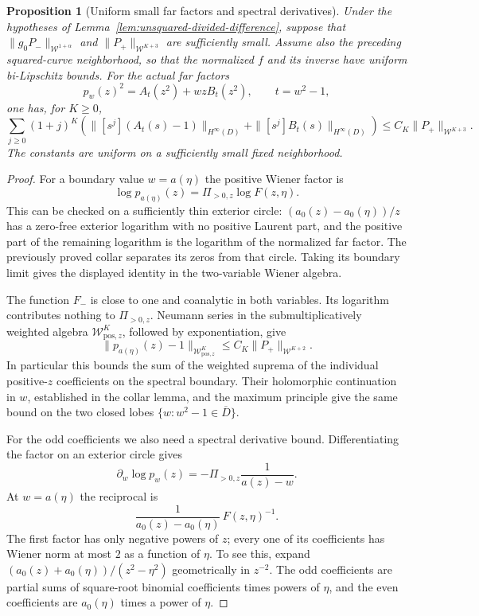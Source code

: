 \documentclass[11pt]{article}
\newtheorem{proposition}{Proposition}[section]
\begin{document}
\begin{proposition}[Uniform small far factors and spectral derivatives]
\label{prop:small-far-factors}
Under the hypotheses of Lemma~\ref{lem:unsquared-divided-difference}, suppose that
$\|g_0P_-\|_{\mathcal W^{1+\alpha}}$ and
$\|P_+\|_{\mathcal W^{K+3}}$ are sufficiently small.
Assume also the preceding squared-curve neighborhood, so that
the normalized $f$ and its inverse have uniform bi-Lipschitz bounds.
For the actual far factors
\[
 p_w(z)^2=A_t(z^2)+wzB_t(z^2),\qquad t=w^2-1,
\]
one has, for $K\ge0$,
\[
 \sum_{j\ge0}(1+j)^K\left(
  \|[s^j](A_t(s)-1)\|_{H^\infty(D)}
       +\|[s^j]B_t(s)\|_{H^\infty(D)}\right)
 \le C_K\|P_+\|_{\mathcal W^{K+3}}.
\]
The constants are uniform on a sufficiently small fixed neighborhood.
\end{proposition}
\begin{proof}
For a boundary value $w=a(\eta)$ the positive Wiener factor is
\[
 \log p_{a(\eta)}(z)=\Pi_{>0,z}\log F(z,\eta).
\]
This can be checked on a sufficiently thin exterior circle:
$(a_0(z)-a_0(\eta))/z$ has a zero-free exterior logarithm
with no positive Laurent part, and the positive part of the
remaining logarithm is the logarithm of the normalized far factor.
The previously proved collar separates its zeros from that circle.
Taking its boundary limit gives the displayed identity in the
two-variable Wiener algebra.

The function $F_-$ is close to one and coanalytic in both
variables. Its logarithm contributes nothing to $\Pi_{>0,z}$.
Neumann series in the submultiplicatively weighted algebra
$\mathcal W_{\mathrm{pos},z}^K$, followed by exponentiation, give
\[
 \|p_{a(\eta)}(z)-1\|_{\mathcal W_{\mathrm{pos},z}^K}
       \le C_K\|P_+\|_{\mathcal W^{K+2}}.
\]
In particular this bounds the sum of the weighted suprema of
the individual positive-$z$ coefficients on the spectral boundary.
Their holomorphic continuation in $w$, established in the collar
lemma, and the maximum principle give the same bound on the two
closed lobes $\{w:w^2-1\in\overline D\}$.

For the odd coefficients we also need a spectral derivative bound.
Differentiating the factor on an exterior circle gives
\[
 \partial_w\log p_w(z)=-\Pi_{>0,z}\frac1{a(z)-w}.
\]
At $w=a(\eta)$ the reciprocal is
\[
 \frac1{a_0(z)-a_0(\eta)}\,F(z,\eta)^{-1}.
\]
The first factor has only negative powers of $z$; every one of
its coefficients has Wiener norm at most $2$ as a function of
$\eta$. To see this, expand
$(a_0(z)+a_0(\eta))/(z^2-\eta^2)$ geometrically in $z^{-2}$.
The odd coefficients are partial sums of square-root binomial
coefficients times powers of $\eta$, and the even coefficients
are $a_0(\eta)$ times a power of $\eta$.


\end{proof}
\end{document}
